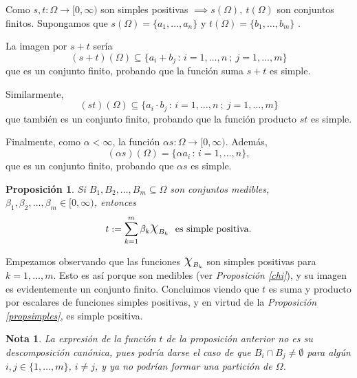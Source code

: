\documentclass[11pt, a4paper]{article}
\makeatletter
\newif\IfInSansMode
\let\oldsf\sffamily
\renewcommand*{\sffamily}{\oldsf\mathversion{sans}\InSansModetrue}
\let\oldnorm\normalfont
\renewcommand*{\normalfont}{\oldnorm\InSansModefalse\mathversion{normal}}
\DeclareRobustCommand{\rchi}{{\Large \mathpalette\irchi\relax}}
\newcommand{\irchi}[2]{\raisebox{0.4\depth}{$#1\chi$}} %
\renewcommand{\O}{\emptyset}
\renewenvironment{proof}[1][\proofname] {\par\pushQED{\qed}\normalfont\topsep6\p@\@plus6\p@\relax\trivlist\item[\hskip\labelsep\itshape\sffamily#1\@addpunct{.}]\ignorespaces}{\popQED\endtrivlist\@endpefalse}
\theoremstyle{theorem-style}
\newtheorem{nprop}{Proposición}[section]
\theoremstyle{definition-style}
\theoremstyle{remark-style}
\newtheorem*{nota}{Nota}
\theoremstyle{example-style}
\makeatother
\begin{document}
  \begin{proof}
    Como $s,t: \Omega \longrightarrow [0,\infty)$ son simples positivas $\implies s(\Omega) , \ t(\Omega)$ son conjuntos finitos. Supongamos que $s(\Omega) =\{ a_1, \dots ,a_n\}$  y $t(\Omega) = \{ b_1, \dots ,b_m\}$ . 

    La imagen por $s+ t$ sería
    $$(s+t)(\Omega) \subseteq \{ a_i + b_j \, :\, i=1,\dots ,n \ ; \ j=1,\dots ,m\}$$
    que es un conjunto finito, probando que la función suma $s+t$ es simple.

    Similarmente, $$(st)(\Omega ) \subseteq \{ a_i \cdot b_j \, : \, i=1,\dots ,n \ ; \ j=1,\dots ,m \}$$
    que también es un conjunto finito, probando que la función producto $st$ es simple.

    Finalmente, como $\alpha< \infty$, la función $\alpha s:\Omega \longrightarrow [0,\infty)$. Además, 
    $$(\alpha s)(\Omega) = \{ \alpha a_i \,:\, i=1,\dots ,n \},$$
    que es un  conjunto finito, probando que $\alpha s$ es simple.
  \end{proof}

\begin{nprop} \label{caract_simples}
Si $B_1, B_2,\dots ,B_m \subseteq \Omega$ son conjuntos medibles,
$\beta_1,\beta_2,\dots,\beta_m \in[0,\infty)$, entonces $$t:= \sum_{k=1}^{m}  \beta_k \rchi_{B_k} \ \ \text{es simple positiva.}$$
\end{nprop}

\begin{proof}
	Empezamos observando que las funciones $\rchi_{B_k}$ son simples positivas para $k=1,\dots,m$. Esto es así porque son medibles (ver \textit{Proposición \ref{chi}}), y su imagen es evidentemente un conjunto finito. Concluimos viendo que $t$ es suma y producto por escalares de funciones simples positivas, y en virtud de la \textit{Proposición \ref{propsimples}}, es simple positiva.
\end{proof}

\begin{nota}
	La expresión de la función $t$ de la proposición anterior no es su descomposición canónica, pues podría darse el caso de que $B_i \cap B_j \neq \O$ para algún $i,j \in \{1,\dots,m\}$, $i\neq j$, y ya no podrían formar una partición de $\Omega$.
\end{nota}
\end{document}
